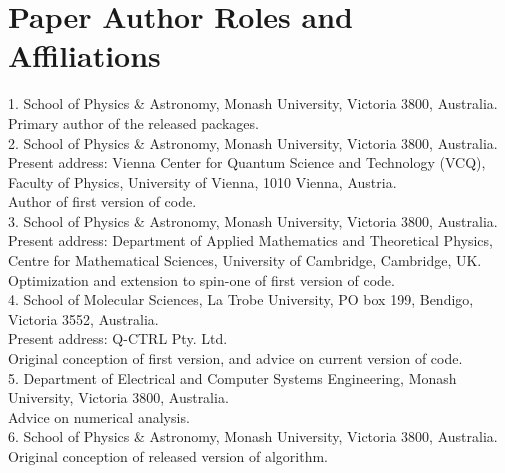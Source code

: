 \documentclass{jors}
\begin{document}
\section{Paper Author Roles and Affiliations}
1. School of Physics \& Astronomy, Monash University, Victoria 3800, Australia.\\
	Primary author of the released packages.\\
2. School of Physics \& Astronomy, Monash University, Victoria 3800, Australia.\\
	Present address: Vienna Center for Quantum Science and Technology (VCQ), Faculty of Physics, University of Vienna, 1010 Vienna, Austria.\\
	Author of first version of code.\\
3. School of Physics \& Astronomy, Monash University, Victoria 3800, Australia.\\
	Present address: Department of Applied Mathematics and Theoretical Physics, Centre for Mathematical Sciences, University of Cambridge, Cambridge, UK.\\
	Optimization and extension to spin-one of first version of code.\\
4. School of Molecular Sciences, La Trobe University, PO box 199, Bendigo, Victoria 3552, Australia.\\
	Present address: Q-CTRL Pty. Ltd.\\
	Original conception of first version, and advice on current version of code.\\
5. Department of Electrical and Computer Systems Engineering, Monash University, Victoria 3800, Australia.\\
	Advice on numerical analysis.\\
6. School of Physics \& Astronomy, Monash University, Victoria 3800, Australia.\\
	Original conception of released version of algorithm.
\end{document}

